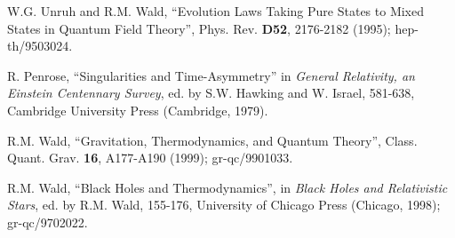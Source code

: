 \begin{thebibliography}{999}
 W.G. Unruh and R.M. Wald, ``Evolution
Laws Taking Pure States to Mixed States in Quantum Field Theory'',
Phys. Rev. {\bf D52}, 2176-2182 (1995);
hep-th/9503024. 

 R. Penrose, ``Singularities and
Time-Asymmetry'' in {\it General Relativity, an Einstein Centennary
Survey}, ed. by S.W. Hawking and W. Israel, 581-638, Cambridge
University Press (Cambridge, 1979).  

 R.M. Wald, ``Gravitation,
Thermodynamics, and Quantum Theory'', Class. Quant. Grav. {\bf 16},
A177-A190 (1999); gr-qc/9901033.  

 R.M. Wald, ``Black Holes and
Thermodynamics'', in {\it Black Holes and Relativistic Stars}, ed. by
R.M. Wald, 155-176, University of Chicago Press (Chicago,
1998); gr-qc/9702022. 

\end{thebibliography}




